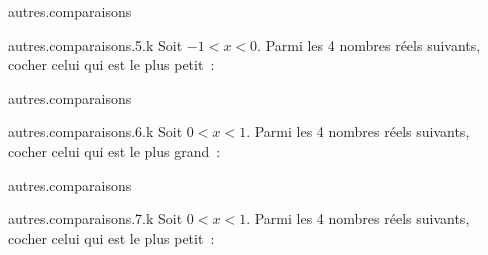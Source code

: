 \begin{qcm}{autres.comparaisons}
	\begin{question}{autres.comparaisons.5.k}
		Soit \(-1<x<0\). Parmi les 4 nombres réels suivants, cocher celui qui est le plus petit~:
		\vspace{-0.2cm}
		\begin{reponseshoriz}
		\end{reponseshoriz}
	\end{question}
\end{qcm}

\begin{qcm}{autres.comparaisons}
	\begin{question}{autres.comparaisons.6.k}
		Soit \(0<x<1\). Parmi les 4 nombres réels suivants, cocher celui qui est le plus grand~:
		\vspace{-0.2cm}
		\begin{reponseshoriz}
			\bonne{\(\dfrac{1}{x}\)}
			\mauvaise{\(\sqrt{x}\)}
			\mauvaise{\(x\)}
			\mauvaise{\(x^2\)}
		\end{reponseshoriz}
	\end{question}
\end{qcm}

\begin{qcm}{autres.comparaisons}
	\begin{question}{autres.comparaisons.7.k}
		Soit \(0<x<1\). Parmi les 4 nombres réels suivants, cocher celui qui est le plus petit~:
		\vspace{-0.2cm}
		\begin{reponseshoriz}
			\mauvaise{\(\dfrac{1}{x}\)}
			\bonne{\(x^2\)}
		\end{reponseshoriz}
	\end{question}
\end{qcm}

